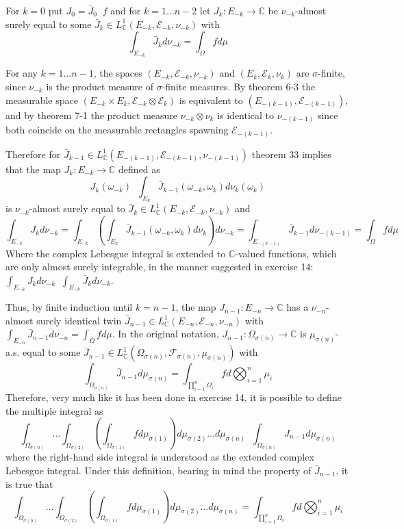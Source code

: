 \documentclass[a4paper]{article}
\newcommand{\brac}[1]{\left ( #1 \right )}
\newcommand{\Cplx}{\mathbb{C}}
\newcommand{\Ecal}{\mathcal{E}}
\newcommand{\Fcal}{\mathcal{F}}
\newcommand{\defn}{\mathop{\overset{\Delta}{=}}\nolimits}
\begin{document}
For $k=0$ put $J_0 = \bar{J}_0 \defn f$ and for $k=1\ldots n-2$ let $J_k:E_{-k}\to \Cplx$ be $\nu_{-k}$-almost surely equal to some $\bar{J}_k\in L^1_\Cplx\brac{ E_{-k}, \Ecal_{-k}, \nu_{-k} }$ with \[\int_{E_{-k}} \bar{J}_k d\nu_{-k} = \int_\Omega f d\mu\]

For any $k=1\ldots n-1$, the spaces $\brac{E_{-k}, \Ecal_{-k}, \nu_{-k}}$ and $\brac{E_k, \Ecal_k, \nu_k}$ are $\sigma$-finite, since $\nu_{-k}$ is the product measure of $\sigma$-finite measures. By theorem 6-3 the measurable space $\brac{E_{-k}\times E_k, \Ecal_{-k}\otimes \Ecal_k}$ is equivalent to $\brac{ E_{-\brac{k-1}}, \Ecal_{-\brac{k-1}} }$, and by theorem 7-1 the product measure $\nu_{-k}\otimes \nu_k$ is identical to $\nu_{-\brac{k-1}}$ since both coincide on the measurable rectangles spawning $\Ecal_{-\brac{k-1}}$.

Therefore for $\bar{J}_{k-1}\in L^1_\Cplx\brac{ E_{-\brac{k-1}}, \Ecal_{-\brac{k-1}}, \nu_{-\brac{k-1}} }$ theorem 33 implies that the map $J_k:E_{-k}\to \Cplx$ defined as \[J_k\brac{\omega_{-k}}\defn \int_{E_k} \bar{J}_{k-1}\brac{\omega_{-k}, \omega_k} d\nu_k\brac{\omega_k}\] is $\nu_{-k}$-almost surely equal to $\bar{J}_k \in L^1_\Cplx\brac{ E_{-k}, \Ecal_{-k}, \nu_{-k} }$ and \[ \int_{E_{-k}} J_k d\nu_{-k} = \int_{E_{-k}} \brac{ \int_{E_k} \bar{J}_{k-1}\brac{\omega_{-k}, \omega_k} d\nu_k } d\nu_{-k} = \int_{E_{-\brac{k-1}}} \bar{J}_{k-1} d\nu_{-\brac{k-1}} = \int_\Omega f d\mu\] Where the complex Lebesgue integral is extended to $\Cplx$-valued functions, which are only almost surely integrable, in the manner suggested in exercise 14: $\int_{E_{-k}} J_k d\nu_{-k} \defn \int_{E_{-k}} \bar{J}_k d\nu_{-k}$.

Thus, by finite induction until $k=n-1$, the map $J_{n-1}:E_{-n}\to \Cplx$ has a $\nu_{-n}$-almost surely identical twin $\bar{J}_{n-1}\in L^1_\Cplx\brac{ E_{-n}, \Ecal_{-n}, \nu_{-n} }$ with $\int_{E_{-n}} \bar{J}_{n-1} d\nu_{-n} = \int_\Omega f d\mu$. In the original notation, $J_{n-1}:\Omega_{\sigma\brac{n}}\to \Cplx$ is $\mu_{\sigma\brac{n}}$-a.s. equal to some $\bar{J}_{n-1}\in L^1_\Cplx\brac{ \Omega_{\sigma\brac{n}}, \Fcal_{\sigma\brac{n}}, \mu_{\sigma\brac{n}}}$ with \[\int_{\Omega_{\sigma\brac{n}}} \bar{J}_{n-1} d\mu_{\sigma\brac{n}} = \int_{\prod_{i=1}^n \Omega_i} f d\bigotimes_{i=1}^n \mu_i\] Therefore, very much like it has been done in exercise 14, it is possible to define the multiple integral as \[\int_{\Omega_{\sigma\brac{n}}} \ldots \int_{\Omega_{\sigma\brac{2}}} \brac{ \int_{\Omega_{\sigma\brac{1}}} f d\mu_{\sigma\brac{1}} } d\mu_{\sigma\brac{2}} \ldots d\mu_{\sigma\brac{n}} \defn \int_{\Omega_{\sigma\brac{n}}} J_{n-1} d\mu_{\sigma\brac{n}}\] where the right-hand side integral is understood as the extended complex Lebesgue integral. Under this definition, bearing in mind the property of $\bar{J}_{n-1}$, it is true that \[\int_{\Omega_{\sigma\brac{n}}} \ldots \int_{\Omega_{\sigma\brac{2}}} \brac{ \int_{\Omega_{\sigma\brac{1}}} f d\mu_{\sigma\brac{1}} } d\mu_{\sigma\brac{2}} \ldots d\mu_{\sigma\brac{n}} = \int_{\prod_{i=1}^n \Omega_i} f d\bigotimes_{i=1}^n \mu_i \]
\end{document}
